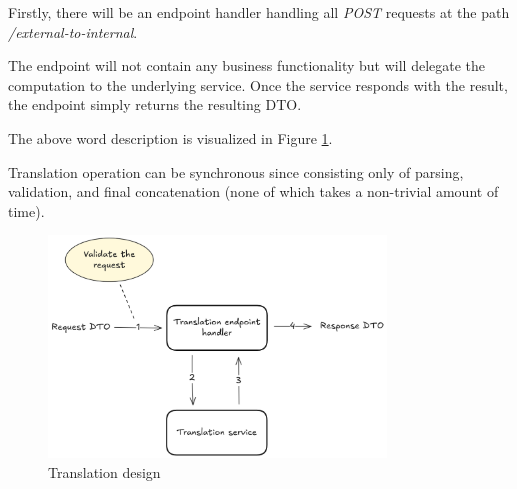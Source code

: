 \documentclass[../main.tex]{subfiles}
\begin{document}
Firstly, there will be an endpoint handler handling all \textit{POST} requests at the path \textit{/external-to-internal}.

The endpoint will not contain any business functionality but will delegate the computation to the underlying service. Once the service responds with the result, the endpoint simply returns the resulting DTO.

The above word description is visualized in Figure \ref{fig:translation-design}.

Translation operation can be synchronous since consisting only of parsing, validation, and final concatenation (none of which takes a non-trivial amount of time).

\begin{figure}
  \begin{center}
    \includegraphics[width=0.8\textwidth]{images/translation-design.png}
  \end{center}
  \caption{Translation design}
  \label{fig:translation-design}
\end{figure}
\end{document}
